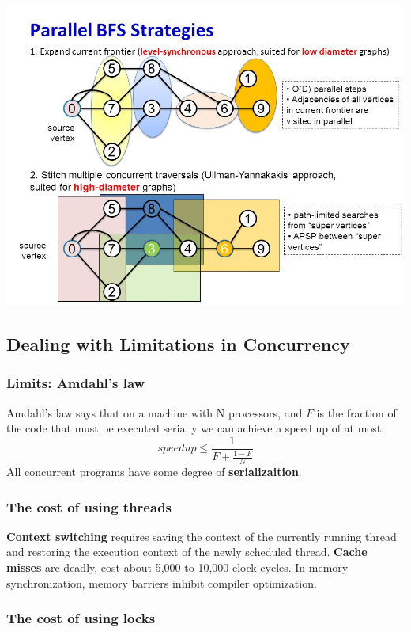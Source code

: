 \documentclass{article}
\begin{document}
\begin{center}
    \includegraphics[scale=0.4]{img/parallel-bfs.jpg}
\end{center}

\subsection{Dealing with Limitations in Concurrency}
\subsubsection{Limits: Amdahl's law}
Amdahl's law says that on a machine with N processors, and $F$ is the fraction of the code that must be executed serially we can achieve a speed up of at most:
\begin{equation}
    speedup \leq \frac{1}{F+\frac{1-F}{N}}
\end{equation}
All concurrent programs have some degree of \textbf{serializaition}.

\subsubsection{The cost of using threads}
\textbf{Context switching} requires saving the context of the currently running thread and restoring the execution context of the newly scheduled thread. \textbf{Cache misses} are deadly, cost about 5,000 to 10,000 clock cycles. In memory synchronization, memory barriers inhibit compiler optimization.

\subsubsection{The cost of using locks}
\end{document}

